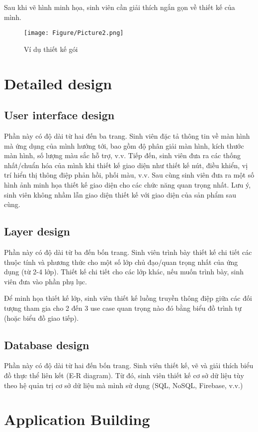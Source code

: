 \documentclass[../Main.tex]{subfiles}
\begin{document}
Sau khi vẽ hình minh họa, sinh viên cần giải thích ngắn gọn về thiết kế của mình. 

\begin{figure}[H]
    \centering
    \texttt{[image: Figure/Picture2.png]}
    \caption{Ví dụ thiết kế gói}
    \label{fig:Fig2}
\end{figure}

\section{Detailed design}
\subsection{User interface design}
Phần này có độ dài từ hai đến ba trang. Sinh viên đặc tả thông tin về màn hình mà ứng dụng của mình hướng tới, bao gồm độ phân giải màn hình, kích thước màn hình, số lượng màu sắc hỗ trợ, v.v. Tiếp đến, sinh viên đưa ra các thống nhất/chuẩn hóa của mình khi thiết kế giao diện như thiết kế nút, điều khiển, vị trí hiển thị thông điệp phản hồi, phối màu, v.v. Sau cùng sinh viên đưa ra một số hình ảnh minh họa thiết kế giao diện cho các chức năng quan trọng nhất. Lưu ý, sinh viên không nhầm lẫn giao diện thiết kế với giao diện của sản phẩm sau cùng.
\subsection{Layer design}
Phần này có độ dài từ ba đến bốn trang. Sinh viên trình bày thiết kế chi tiết các thuộc tính và phương thức cho một số lớp chủ đạo/quan trọng nhất của ứng dụng (từ 2-4 lớp). Thiết kế chi tiết cho các lớp khác, nếu muốn trình bày, sinh viên đưa vào phần phụ lục.

Để minh họa thiết kế lớp, sinh viên thiết kế luồng truyền thông điệp giữa các đối tượng tham gia cho 2 đến 3 use case quan trọng nào đó bằng biểu đồ trình tự (hoặc biểu đồ giao tiếp).
\subsection{Database design}
Phần này có độ dài từ hai đến bốn trang. Sinh viên thiết kế, vẽ và giải thích biểu đồ thực thể liên kết (E-R diagram). Từ đó, sinh viên thiết kế cơ sở dữ liệu tùy theo hệ quản trị cơ sở dữ liệu mà mình sử dụng (SQL, NoSQL, Firebase, v.v.)

\section{Application Building}
\end{document}
